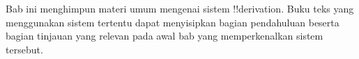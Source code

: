 \documentclass[../../../include/open-logic-chapter]{subfiles}
\begin{document}
      {}
      {}

\begin{editorial}
Bab ini menghimpun materi umum mengenai sistem !!{derivation}. Buku
teks yang menggunakan sistem tertentu dapat menyisipkan bagian
pendahuluan beserta bagian tinjauan yang relevan pada awal bab yang
memperkenalkan sistem tersebut.
\end{editorial}






\OLEndChapterHook
\end{document}
